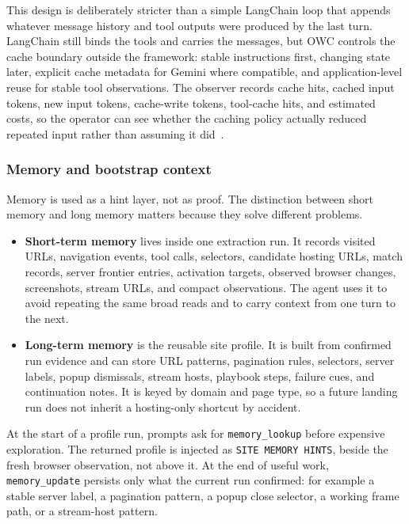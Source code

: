 This design is deliberately stricter than a simple LangChain loop that appends whatever
message history and tool outputs were produced by the last turn. LangChain still binds
the tools and carries the messages, but OWC controls the cache boundary outside the
framework: stable instructions first, changing state later, explicit cache metadata for
Gemini where compatible, and application-level reuse for stable tool observations. The
observer records cache hits, cached input tokens, new input tokens, cache-write tokens,
tool-cache hits, and estimated costs, so the operator can see whether the caching policy
actually reduced repeated input rather than assuming it did~\cite{gemini-pricing,gemini-caching}.



\subsubsection{Memory and bootstrap context}

Memory is used as a hint layer, not as proof. The distinction between short memory and
long memory matters because they solve different problems.
\begin{itemize}
  \item \textbf{Short-term memory} lives inside one extraction run. It records visited
  URLs, navigation events, tool calls, selectors, candidate hosting URLs, match records,
  server frontier entries, activation targets, observed browser changes, screenshots,
  stream URLs, and compact observations. The agent uses it to avoid repeating the same
  broad reads and to carry context from one turn to the next.
  \item \textbf{Long-term memory} is the reusable site profile. It is built from
  confirmed run evidence and can store URL patterns, pagination rules, selectors, server
  labels, popup dismissals, stream hosts, playbook steps, failure cues, and continuation
  notes. It is keyed by domain and page type, so a future landing run does not inherit a
  hosting-only shortcut by accident.
\end{itemize}

At the start of a profile run, prompts ask for \texttt{memory\_lookup} before expensive
exploration. The returned profile is injected as \texttt{SITE MEMORY HINTS}, beside the
fresh browser observation, not above it. At the end of useful work,
\texttt{memory\_update} persists only what the current run confirmed: for example a
stable server label, a pagination pattern, a popup close selector, a working frame path,
or a stream-host pattern.

